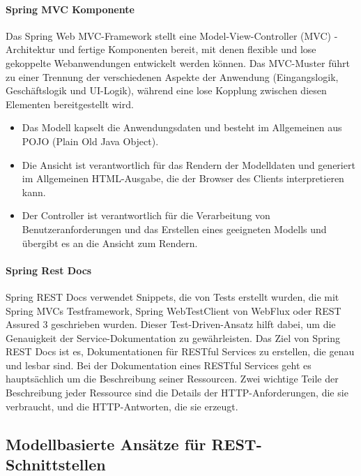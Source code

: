 \paragraph{Spring MVC Komponente}\mbox{}

Das Spring Web MVC-Framework stellt eine Model-View-Controller (MVC) -Architektur und fertige Komponenten bereit, mit denen flexible und lose gekoppelte Webanwendungen entwickelt werden können. Das MVC-Muster führt zu einer Trennung der verschiedenen Aspekte der Anwendung (Eingangslogik, Geschäftslogik und UI-Logik), während eine lose Kopplung zwischen diesen Elementen bereitgestellt wird\cite{tp12mvc}.

\begin{itemize}
	\item Das Modell kapselt die Anwendungsdaten und besteht im Allgemeinen aus POJO (Plain Old Java Object).
	\item Die Ansicht ist verantwortlich für das Rendern der Modelldaten und generiert im Allgemeinen HTML-Ausgabe, die der Browser des Clients interpretieren kann.
	\item Der Controller ist verantwortlich für die Verarbeitung von Benutzeranforderungen und das Erstellen eines geeigneten Modells und übergibt es an die Ansicht zum Rendern.
\end{itemize}

\paragraph{Spring Rest Docs}\mbox{}

Spring REST Docs verwendet Snippets, die von Tests erstellt wurden, die mit Spring MVCs Testframework, Spring WebTestClient von WebFlux oder REST Assured 3 geschrieben wurden. Dieser Test-Driven-Ansatz hilft dabei, um die Genauigkeit der Service-Dokumentation zu gewährleisten. Das Ziel von Spring REST Docs ist es, Dokumentationen für RESTful Services zu erstellen, die genau und lesbar sind. Bei der Dokumentation eines RESTful Services geht es hauptsächlich um die Beschreibung seiner Ressourcen. Zwei wichtige Teile der Beschreibung jeder Ressource sind die Details der HTTP-Anforderungen, die sie verbraucht, und die HTTP-Antworten, die sie erzeugt\cite{srd18wilkinson}.

\subsection{Modellbasierte Ansätze für REST-Schnittstellen}

